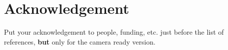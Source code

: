 \documentclass[conference, compsoc, twoside]{IEEEtran}
\begin{document}
\section*{Acknowledgement}
Put your acknowledgement to people, funding, etc. just before the list of references, \textbf{but} only for the camera ready version.
%
%

\balance

%
%
\end{document}
